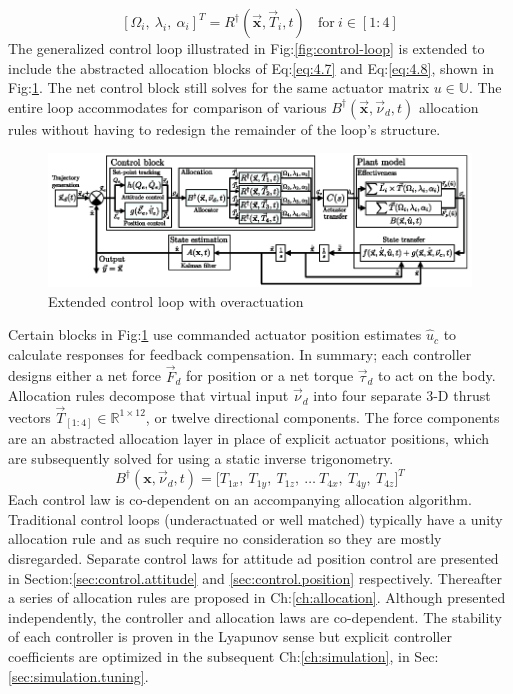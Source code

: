\begin{equation}\label{eq:4.8}
[\Omega_i,~\lambda_i,~\alpha_i]^T=R^\dagger(\vec{\mathbf{x}},\vec{T}_i,t)~~~~\text{for}~i\in[1:4]
\end{equation}
The generalized control loop illustrated in Fig:\ref{fig:control-loop} is extended to include the abstracted allocation blocks of Eq:\ref{eq:4.7} and Eq:\ref{eq:4.8}, shown in Fig:\ref{fig:control-block}. The net control block still solves for the same actuator matrix $u\in\mathbb{U}$. The entire loop accommodates for comparison of various $B^\dagger(\vec{\mathbf{x}},\vec{\nu}_d,t)$ allocation rules without having to redesign the remainder of the loop's structure.
\begin{figure}[htbp]
\vspace{-6pt}
\centering
\includegraphics[width=\textwidth]{figs/control-block}
\caption{Extended control loop with overactuation}
\label{fig:control-block}
\vspace{-8pt}
\end{figure}
\par
Certain blocks in Fig:\ref{fig:control-block} use commanded actuator position estimates $\hat{u}_c$ to calculate responses for feedback compensation. In summary; each controller designs either a net force $\vec{F}_d$ for position or a net torque $\vec{\tau}_d$ to act on the body. Allocation rules decompose that virtual input $\vec{\nu}_d$ into four separate 3-D thrust vectors $\vec{T}_{[1:4]}\in\mathbb{R}^{1\times 12}$, or twelve directional components. The force components are an abstracted allocation layer in place of explicit actuator positions, which are subsequently solved for using a static inverse trigonometry.
\begin{equation}
B^{\dagger}(\mathbf{x},\vec{\nu}_d,t)=\big[ T_{1x},~T_{1y},~T_{1z},~\ldots~T_{4x},~T_{4y},~T_{4z}\big]^T
\end{equation}
Each control law is co-dependent on an accompanying allocation algorithm. Traditional control loops (underactuated or well matched) typically have a unity allocation rule and as such require no consideration so they are mostly disregarded. Separate control laws for attitude ad position control are presented in Section:\ref{sec:control.attitude} and \ref{sec:control.position} respectively. Thereafter a series of allocation rules are proposed in Ch:\ref{ch:allocation}. Although presented independently, the controller and allocation laws are co-dependent. The stability of each controller is proven in the Lyapunov sense but explicit controller coefficients are optimized in the subsequent Ch:\ref{ch:simulation}, in Sec:\ref{sec:simulation.tuning}.
